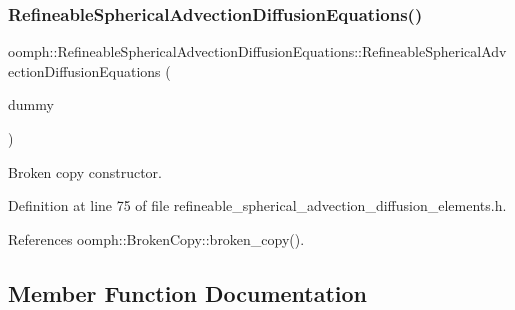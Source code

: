 \subsubsection{\texorpdfstring{Refineable\+Spherical\+Advection\+Diffusion\+Equations()}{RefineableSphericalAdvectionDiffusionEquations()}\hspace{0.1cm}{\footnotesize\ttfamily [2/2]}}
{\footnotesize\ttfamily oomph\+::\+Refineable\+Spherical\+Advection\+Diffusion\+Equations\+::\+Refineable\+Spherical\+Advection\+Diffusion\+Equations (\begin{DoxyParamCaption}\item[{const \hyperlink{classoomph_1_1RefineableSphericalAdvectionDiffusionEquations}{Refineable\+Spherical\+Advection\+Diffusion\+Equations} \&}]{dummy }\end{DoxyParamCaption})\hspace{0.3cm}{\ttfamily [inline]}}



Broken copy constructor. 



Definition at line 75 of file refineable\+\_\+spherical\+\_\+advection\+\_\+diffusion\+\_\+elements.\+h.



References oomph\+::\+Broken\+Copy\+::broken\+\_\+copy().



\subsection{Member Function Documentation}
\mbox{\label{classoomph_1_1RefineableSphericalAdvectionDiffusionEquations_ad334452c86e729a53dcbd234a1420680}} 
